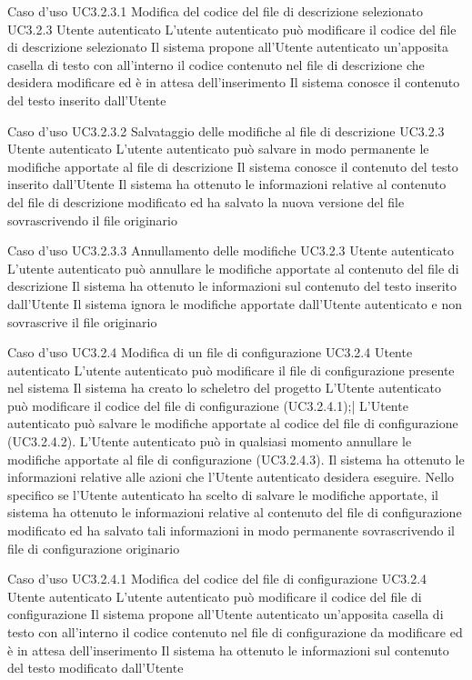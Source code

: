 \UCtitle
{Caso d'uso UC3.2.3.1}  
{Modifica del codice del file di descrizione selezionato}
\UC		
{UC3.2.3}		
{Utente autenticato}
{L'utente autenticato può modificare il codice del file di descrizione selezionato}
{Il sistema propone all'Utente autenticato un'apposita casella di testo con all'interno il codice contenuto nel file di descrizione che desidera modificare ed è in attesa dell'inserimento}
\post
{Il sistema conosce il contenuto del testo inserito dall'Utente}

\UCtitle
{Caso d'uso UC3.2.3.2}  
{Salvataggio delle modifiche al file di descrizione}	
\UC	
{UC3.2.3}		
{Utente autenticato}
{L'utente autenticato può salvare in modo permanente le modifiche apportate al file di descrizione}
{Il sistema conosce il contenuto del testo inserito dall'Utente}
\post
{Il sistema ha ottenuto le informazioni relative al contenuto del file di descrizione modificato ed ha salvato la nuova versione del file sovrascrivendo il file originario}

\UCtitle
{Caso d'uso UC3.2.3.3}  
{Annullamento delle modifiche}	
\UC	
{UC3.2.3}		
{Utente autenticato}
{L'utente autenticato può annullare le modifiche apportate al contenuto del file di descrizione}
{Il sistema ha ottenuto le informazioni sul contenuto del testo inserito dall'Utente}
\post
{Il sistema ignora le modifiche apportate dall'Utente autenticato e non sovrascrive il file originario}


\UCtitle
{Caso d'uso UC3.2.4}  
{Modifica di un file di configurazione}
\UC		
{UC3.2.4}		
{Utente autenticato}
{L'utente autenticato può modificare il file di configurazione presente nel sistema}
{Il sistema ha creato lo scheletro del progetto}
\scenario
{L'Utente autenticato può modificare il codice del file di configurazione (UC3.2.4.1);|
L'Utente autenticato può salvare le modifiche apportate al codice del file di configurazione (UC3.2.4.2).
}
\estensioni
{L'Utente autenticato può in qualsiasi momento annullare le modifiche apportate al file di configurazione (UC3.2.4.3).}
\post
{Il sistema ha ottenuto le informazioni relative alle azioni che l'Utente autenticato desidera eseguire. Nello specifico se l'Utente autenticato ha scelto di salvare le modifiche apportate, il sistema ha ottenuto le informazioni relative al contenuto del file di configurazione modificato ed ha salvato tali informazioni in modo permanente sovrascrivendo il file di configurazione originario}

\UCtitle
{Caso d'uso UC3.2.4.1}  
{Modifica del codice del file di configurazione}
\UC		
{UC3.2.4}		
{Utente autenticato}
{L'utente autenticato può modificare il codice del file di configurazione}
{Il sistema propone all'Utente autenticato un'apposita casella di testo con all'interno il codice contenuto nel file di configurazione da modificare ed è in attesa dell'inserimento}
\post
{Il sistema ha ottenuto le informazioni sul contenuto del testo modificato dall'Utente}

